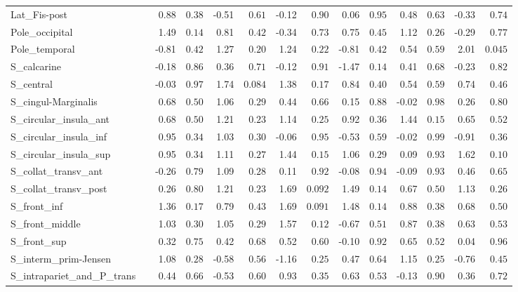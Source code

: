 {\begin{longtable}{llrrrrrrrrrrrr}
Lat\_Fis-post &  & 0.88 & $0.38$ & -0.51 & $0.61$ & -0.12 & $0.90$ & 0.06 & $0.95$ & 0.48 & $0.63$ & -0.33 & $0.74$ \\
Pole\_occipital &  & 1.49 & $0.14$ & 0.81 & $0.42$ & -0.34 & $0.73$ & 0.75 & $0.45$ & 1.12 & $0.26$ & -0.29 & $0.77$ \\
Pole\_temporal &  & -0.81 & $0.42$ & 1.27 & $0.20$ & 1.24 & $0.22$ & -0.81 & $0.42$ & 0.54 & $0.59$ & 2.01 & $0.045$ \\
S\_calcarine &  & -0.18 & $0.86$ & 0.36 & $0.71$ & -0.12 & $0.91$ & -1.47 & $0.14$ & 0.41 & $0.68$ & -0.23 & $0.82$ \\
S\_central &  & -0.03 & $0.97$ & 1.74 & $0.084$ & 1.38 & $0.17$ & 0.84 & $0.40$ & 0.54 & $0.59$ & 0.74 & $0.46$ \\
S\_cingul-Marginalis &  & 0.68 & $0.50$ & 1.06 & $0.29$ & 0.44 & $0.66$ & 0.15 & $0.88$ & -0.02 & $0.98$ & 0.26 & $0.80$ \\
S\_circular\_insula\_ant &  & 0.68 & $0.50$ & 1.21 & $0.23$ & 1.14 & $0.25$ & 0.92 & $0.36$ & 1.44 & $0.15$ & 0.65 & $0.52$ \\
S\_circular\_insula\_inf &  & 0.95 & $0.34$ & 1.03 & $0.30$ & -0.06 & $0.95$ & -0.53 & $0.59$ & -0.02 & $0.99$ & -0.91 & $0.36$ \\
S\_circular\_insula\_sup &  & 0.95 & $0.34$ & 1.11 & $0.27$ & 1.44 & $0.15$ & 1.06 & $0.29$ & 0.09 & $0.93$ & 1.62 & $0.10$ \\
S\_collat\_transv\_ant &  & -0.26 & $0.79$ & 1.09 & $0.28$ & 0.11 & $0.92$ & -0.08 & $0.94$ & -0.09 & $0.93$ & 0.46 & $0.65$ \\
S\_collat\_transv\_post &  & 0.26 & $0.80$ & 1.21 & $0.23$ & 1.69 & $0.092$ & 1.49 & $0.14$ & 0.67 & $0.50$ & 1.13 & $0.26$ \\
S\_front\_inf &  & 1.36 & $0.17$ & 0.79 & $0.43$ & 1.69 & $0.091$ & 1.48 & $0.14$ & 0.88 & $0.38$ & 0.68 & $0.50$ \\
S\_front\_middle &  & 1.03 & $0.30$ & 1.05 & $0.29$ & 1.57 & $0.12$ & -0.67 & $0.51$ & 0.87 & $0.38$ & 0.63 & $0.53$ \\
S\_front\_sup &  & 0.32 & $0.75$ & 0.42 & $0.68$ & 0.52 & $0.60$ & -0.10 & $0.92$ & 0.65 & $0.52$ & 0.04 & $0.96$ \\
S\_interm\_prim-Jensen &  & 1.08 & $0.28$ & -0.58 & $0.56$ & -1.16 & $0.25$ & 0.47 & $0.64$ & 1.15 & $0.25$ & -0.76 & $0.45$ \\
S\_intrapariet\_and\_P\_trans &  & 0.44 & $0.66$ & -0.53 & $0.60$ & 0.93 & $0.35$ & 0.63 & $0.53$ & -0.13 & $0.90$ & 0.36 & $0.72$ \\

\end{longtable}}
